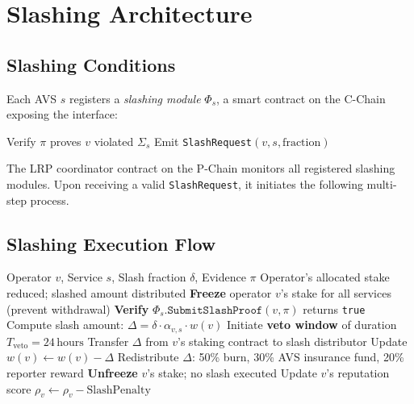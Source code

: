 \section{Slashing Architecture}

\label{sec:slashing}

\subsection{Slashing Conditions}

Each AVS $s$ registers a \emph{slashing module} $\Phi_s$, a smart contract on the C-Chain
exposing the interface:

\begin{algorithmic}
  \State Verify $\pi$ proves $v$ violated $\Sigma_s$
  \State Emit \texttt{SlashRequest}$(v, s, \text{fraction})$
\EndFunction
\end{algorithmic}

The LRP coordinator contract on the P-Chain monitors all registered slashing modules.
Upon receiving a valid \texttt{SlashRequest}, it initiates the following multi-step process.

\subsection{Slashing Execution Flow}

\begin{algorithm}[H]
\caption{LRP Slashing Protocol}
\label{alg:slash}
\begin{algorithmic}[1]
\Require Operator $v$, Service $s$, Slash fraction $\delta$, Evidence $\pi$
\Ensure Operator's allocated stake reduced; slashed amount distributed
\State \textbf{Freeze} operator $v$'s stake for all services (prevent withdrawal)
\State \textbf{Verify} $\Phi_s.\texttt{SubmitSlashProof}(v, \pi)$ returns \texttt{true}
\State Compute slash amount: $\Delta = \delta \cdot \alpha_{v,s} \cdot w(v)$
\State Initiate \textbf{veto window} of duration $T_{\text{veto}} = 24\,\text{hours}$
  \State Transfer $\Delta$ from $v$'s staking contract to slash distributor
  \State Update $w(v) \leftarrow w(v) - \Delta$
  \State Redistribute $\Delta$: 50\% burn, 30\% AVS insurance fund, 20\% reporter reward
\Else
  \State \textbf{Unfreeze} $v$'s stake; no slash executed
\EndIf
\State Update $v$'s reputation score $\rho_v \leftarrow \rho_v - \text{SlashPenalty}$
\end{algorithmic}
\end{algorithm}

